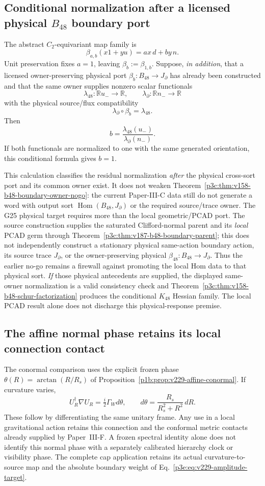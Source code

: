 \documentclass[12pt,a4paper]{article}
\begin{document}
\subsection{Conditional normalization after a licensed physical $B_{48}$ boundary port}
\label{p3c:sec:v184-g25-conditional-normalization}
The abstract $C_2$-equivariant map family is
\[
 \beta_{a,b}(x1+yu)=ax\,d+by\,n.
\]
Unit preservation fixes $a=1$, leaving $\beta_b:=\beta_{1,b}$.  Suppose,
\emph{in addition}, that a licensed owner-preserving physical port
$\beta_b:B_{48}\to J_\partial$ has already been constructed and that the same
owner supplies nonzero scalar functionals
\[
 \lambda_{48}:\mathbb Ru_-\to\mathbb R,
 \qquad
 \lambda_\partial:\mathbb Rn_-\to\mathbb R
\]
with the physical source/flux compatibility
\[
 \lambda_\partial\circ\beta_b=\lambda_{48}.
\]
Then
\[
 \boxed{b=\frac{\lambda_{48}(u_-)}{\lambda_\partial(n_-)}}.
\]
If both functionals are normalized to one with the same generated orientation,
this conditional formula gives $b=1$.

This calculation classifies the residual normalization \emph{after} the
physical cross-sort port and its common owner exist.  It does not weaken
Theorem~\ref{p3c:thm:v158-b48-boundary-owner-nogo}: the current Paper-III-C
data still do not generate a word with output sort
$\operatorname{Hom}(B_{48},J_\partial)$ or the required source/trace owner.
The G25 physical target requires more than the local geometric/PCAD
port. The source construction supplies the saturated Clifford-normal parent and its
\emph{local} PCAD germ through
Theorem~\ref{p3c:thm:v187-b48-boundary-parent}; this does not independently
construct a stationary physical same-action boundary action, its source
trace \(J_\partial\), or the owner-preserving physical
\(\beta_{48}:B_{48}\to J_\partial\). Thus the earlier no-go remains
a firewall against promoting the local Hom data to that physical sort.
\emph{If} those physical antecedents are supplied, the displayed same-owner
normalization is a valid consistency check and
Theorem~\ref{p3c:thm:v158-b48-schur-factorization} produces the
conditional \(K_{48}\) Hessian family. The local PCAD result alone does
not discharge this physical-response premise.



\subsection{The affine normal phase retains its local connection contact}
\label{p3c:sec:v229-normal-phase}
The conormal comparison uses the explicit frozen phase
$\theta(R)=\arctan(R/R_s)$ of
Proposition~\ref{p1b:prop:v229-affine-conormal}. If curvature varies,
\[
 U_R^\dagger\nabla U_R=\tfrac i2\Gamma_Wd\theta,\qquad
 d\theta=\frac{R_s}{R_s^2+R^2}\,dR.
\]
These follow by differentiating the same unitary frame. Any use in a
local gravitational action retains this connection and the conformal
metric contacts already supplied by Paper~III-F. A frozen spectral
identity alone does not identify this normal phase with a separately
calibrated hierarchy clock or visibility phase. The complete cap
application retains its actual curvature-to-source map and the
absolute boundary weight of Eq.~\eqref{p3e:eq:v229-amplitude-target}.
\end{document}
